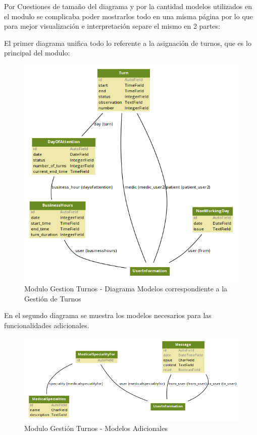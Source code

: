 Por Cuestiones de tamaño del diagrama y por la cantidad modelos utilizados en el modulo se complicaba poder mostrarlos todo en una misma página por lo que para mejor visualización e interpretación separe el mismo en 2 partes:

El primer diagrama unifica todo lo referente a la asignación de turnos, que es lo principal del modulo:

\begin{figure}[H]
    \centering
    \includegraphics[scale=0.6]{resourse/gt-gt.png}
    \caption{Modulo Gestion Turnos - Diagrama Modelos correspondiente a la Gestión de Turnos}
    \label{fig:124}
\end{figure}  

En el segundo diagrama se muestra los modelos necesarios para las funcionalidades adicionales.

\begin{figure}[H]
    \centering
    \includegraphics[scale=0.6]{resourse/gt-ot.png}
    \caption{Modulo Gestión Turnos - Modelos Adicionales}
    \label{fig:125}
\end{figure}  


